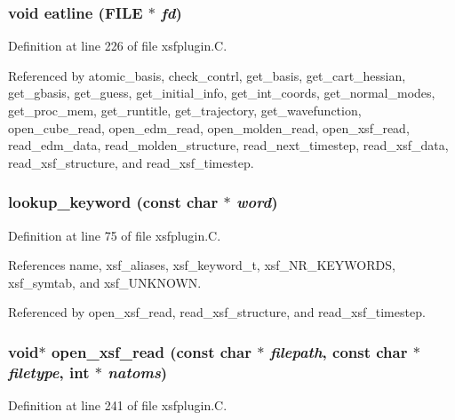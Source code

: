 \subsubsection{\setlength{\rightskip}{0pt plus 5cm}void eatline (FILE $\ast$ {\em fd})\hspace{0.3cm}{\tt  [static]}}\label{xsfplugin_8C_a36}




Definition at line 226 of file xsfplugin.C.

Referenced by atomic\_\-basis, check\_\-contrl, get\_\-basis, get\_\-cart\_\-hessian, get\_\-gbasis, get\_\-guess, get\_\-initial\_\-info, get\_\-int\_\-coords, get\_\-normal\_\-modes, get\_\-proc\_\-mem, get\_\-runtitle, get\_\-trajectory, get\_\-wavefunction, open\_\-cube\_\-read, open\_\-edm\_\-read, open\_\-molden\_\-read, open\_\-xsf\_\-read, read\_\-edm\_\-data, read\_\-molden\_\-structure, read\_\-next\_\-timestep, read\_\-xsf\_\-data, read\_\-xsf\_\-structure, and read\_\-xsf\_\-timestep.
\subsubsection{ lookup\_\-keyword (const char $\ast$ {\em word})\hspace{0.3cm}{\tt  [static]}}\label{xsfplugin_8C_a32}




Definition at line 75 of file xsfplugin.C.

References name, xsf\_\-aliases, xsf\_\-keyword\_\-t, xsf\_\-NR\_\-KEYWORDS, xsf\_\-symtab, and xsf\_\-UNKNOWN.

Referenced by open\_\-xsf\_\-read, read\_\-xsf\_\-structure, and read\_\-xsf\_\-timestep.
\subsubsection{\setlength{\rightskip}{0pt plus 5cm}void$\ast$ open\_\-xsf\_\-read (const char $\ast$ {\em filepath}, const char $\ast$ {\em filetype}, int $\ast$ {\em natoms})\hspace{0.3cm}{\tt  [static]}}\label{xsfplugin_8C_a39}




Definition at line 241 of file xsfplugin.C.


